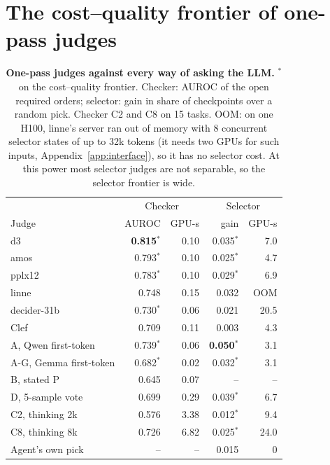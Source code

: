 \documentclass[11pt]{article}
\begin{document}
\FloatBarrier
\section{The cost--quality frontier of one-pass judges}\label{app:frontier}

\begin{table}[t]
\centering\small
\setlength{\tabcolsep}{2.5pt}\begin{tabular}{@{}lrrrr@{}}\toprule
 & \multicolumn{2}{c}{Checker} & \multicolumn{2}{c}{Selector} \\
Judge & AUROC & GPU-s & gain & GPU-s \\\midrule
d3 & \textbf{0.815}$^*$ & 0.10 & 0.035$^*$ & 7.0 \\
amos & 0.793$^*$ & 0.10 & 0.025$^*$ & 4.7 \\
pplx12 & 0.783$^*$ & 0.10 & 0.029$^*$ & 6.9 \\
linne & 0.748 & 0.15 & 0.032 & OOM \\
decider-31b & 0.730$^*$ & 0.06 & 0.021 & 20.5 \\
Clef & 0.709 & 0.11 & 0.003 & 4.3 \\\midrule
A, Qwen first-token & 0.739$^*$ & 0.06 & \textbf{0.050}$^*$ & 3.1 \\
A-G, Gemma first-token & 0.682$^*$ & 0.02 & 0.032$^*$ & 3.1 \\
B, stated P & 0.645 & 0.07 & -- & -- \\
D, 5-sample vote & 0.699 & 0.29 & 0.039$^*$ & 6.7 \\
C2, thinking 2k & 0.576 & 3.38 & 0.012$^*$ & 9.4 \\
C8, thinking 8k & 0.726 & 6.82 & 0.025$^*$ & 24.0 \\
Agent's own pick & -- & -- & 0.015 & 0 \\\bottomrule
\end{tabular}
\caption{\textbf{One-pass judges against every way of asking the LLM.} $^*$ on the cost--quality frontier. Checker:
AUROC of the open required orders; selector: gain in share of checkpoints over a random pick. Checker C2 and C8 on 15
tasks. OOM: on one H100, linne's server ran out of memory with 8 concurrent selector states of up to 32k tokens
(it needs two GPUs for such inputs, Appendix~\ref{app:interface}), so it has no selector cost. At this power most selector judges are not separable, so the selector frontier is wide.}
\label{tab:frontier}
\end{table}
\end{document}
